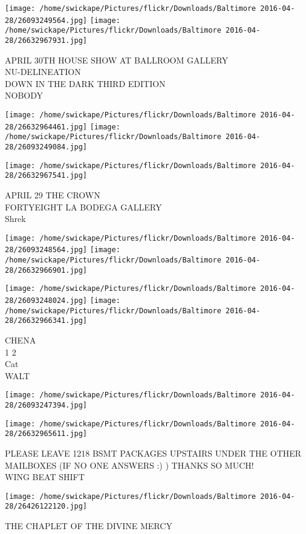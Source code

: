 \documentclass[10pt,letterpaper]{article}
\begin{document}
\texttt{[image: /home/swickape/Pictures/flickr/Downloads/Baltimore 2016-04-28/26093249564.jpg]}
\texttt{[image: /home/swickape/Pictures/flickr/Downloads/Baltimore 2016-04-28/26632967931.jpg]}

APRIL 30TH HOUSE SHOW AT BALLROOM GALLERY\\
NU{-}DELINEATION\\
DOWN IN THE DARK THIRD EDITION\\
NOBODY
\pagebreak

\texttt{[image: /home/swickape/Pictures/flickr/Downloads/Baltimore 2016-04-28/26632964461.jpg]}
\texttt{[image: /home/swickape/Pictures/flickr/Downloads/Baltimore 2016-04-28/26093249084.jpg]}

\vspace{0.25in}
\texttt{[image: /home/swickape/Pictures/flickr/Downloads/Baltimore 2016-04-28/26632967541.jpg]}

APRIL 29 THE CROWN\\
FORTYEIGHT LA BODEGA GALLERY\\
Shrek
\pagebreak

\texttt{[image: /home/swickape/Pictures/flickr/Downloads/Baltimore 2016-04-28/26093248564.jpg]}
\texttt{[image: /home/swickape/Pictures/flickr/Downloads/Baltimore 2016-04-28/26632966901.jpg]}

\texttt{[image: /home/swickape/Pictures/flickr/Downloads/Baltimore 2016-04-28/26093248024.jpg]}
\texttt{[image: /home/swickape/Pictures/flickr/Downloads/Baltimore 2016-04-28/26632966341.jpg]}

CHENA\\
1 2\\
Cat\\
WALT
\pagebreak

\texttt{[image: /home/swickape/Pictures/flickr/Downloads/Baltimore 2016-04-28/26093247394.jpg]}

\vspace{0.25in}
\texttt{[image: /home/swickape/Pictures/flickr/Downloads/Baltimore 2016-04-28/26632965611.jpg]}

PLEASE LEAVE 1218 BSMT PACKAGES UPSTAIRS UNDER THE OTHER MAILBOXES (IF NO ONE ANSWERS :) )  THANKS SO MUCH!\\
WING BEAT SHIFT
\pagebreak

\texttt{[image: /home/swickape/Pictures/flickr/Downloads/Baltimore 2016-04-28/26426122120.jpg]}

THE CHAPLET OF THE DIVINE MERCY
\pagebreak
\end{document}
